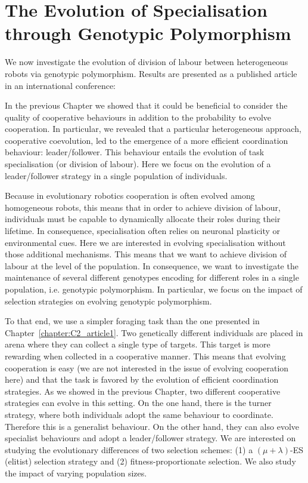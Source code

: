 \chapter{The Evolution of Specialisation through Genotypic Polymorphism}
\label{chapter:C2_article2}

\setcounter{secnumdepth}{0}
\setcounter{minitocdepth}{1}
\minitoc[n] %

We now investigate the evolution of division of labour between heterogeneous robots via genotypic polymorphism. Results are presented as a published article in an international conference:

\begin{quote}
\end{quote}


In the previous Chapter we showed that it could be beneficial to consider the quality of cooperative behaviours in addition to the probability to evolve cooperation. In particular, we revealed that a particular heterogeneous approach, cooperative coevolution, led to the emergence of a more efficient coordination behaviour: leader/follower. This behaviour entails the evolution of task specialisation (or division of labour). Here we focus on the evolution of a leader/follower strategy in a single population of individuals. 

Because in evolutionary robotics cooperation is often evolved among homogeneous robots, this means that in order to achieve division of labour, individuals must be capable to dynamically allocate their roles during their lifetime. In consequence, specialisation often relies on neuronal plasticity or environmental cues. Here we are interested in evolving specialisation without those additional mechanisms. This means that we want to achieve division of labour at the level of the population. In consequence, we want to investigate the maintenance of several different genotypes encoding for different roles in a single population, i.e. genotypic polymorphism. In particular, we focus on the impact of selection strategies on evolving genotypic polymorphism.

To that end, we use a simpler foraging task than the one presented in Chapter~\ref{chapter:C2_article1}. Two genetically different individuals are placed in arena where they can collect a single type of targets. This target is more rewarding when collected in a cooperative manner. This means that evolving cooperation is easy (we are not interested in the issue of evolving cooperation here) and that the task is favored by the evolution of efficient coordination strategies. As we showed in the previous Chapter, two different cooperative strategies can evolve in this setting. On the one hand, there is the turner strategy, where both individuals adopt the same behaviour to coordinate. Therefore this is a generalist behaviour. On the other hand, they can also evolve specialist behaviours and adopt a leader/follower strategy. We are interested on studying the evolutionary differences of two selection schemes: (1) a \((\mu + \lambda)\)-ES (elitist) selection strategy and (2) fitness-proportionate selection. We also study the impact of varying population sizes.


